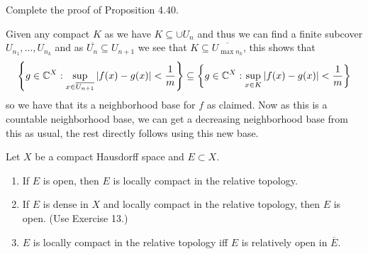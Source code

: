 \documentclass[12pt,a4paper]{article}
\begin{document}
\begin{problem}\label{prob:4-48}
Complete the proof of Proposition 4.40.
\end{problem}
\begin{solution}
    Given any compact $K$ as we have $K \subseteq\cup U_n$ and thus we can find a finite subcover $U_{n_1},\ldots,U_{n_k}$ and as $ \overline{ U_n} \subseteq U_{n+1}$ we see that $K \subseteq \overline{U_{\max n_k}}$, this shows that 
    \[
        \qty{g\in\mathbb{C}^X:\sup_{x\in \overline{U_{n+1}}}|f(x)-g(x)|< \frac{1}{m}}\subseteq\qty{g\in\mathbb{C}^X:\sup_{x\in K}|f(x)-g(x)|< \frac{1}{m}}
    \]
    so we have that its a neighborhood base for $f$ as claimed. 
    Now as this is a countable neighborhood base, we can get a decreasing neighborhood base from this as usual, the rest directly follows using this new base.  
\end{solution}
\begin{problem}\label{prob:4-49}
Let $X$ be a compact Hausdorff space and $E \subset X$.
\begin{enumerate}[label=\alph*.]
    \item If $E$ is open, then $E$ is locally compact in the relative topology.
    \item If $E$ is dense in $X$ and locally compact in the relative topology, then $E$ is open. (Use Exercise 13.)
    \item $E$ is locally compact in the relative topology iff $E$ is relatively open in $\overline{E}$.
\end{enumerate}
\end{problem}
\end{document}
